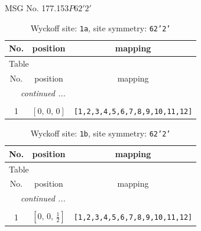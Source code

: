 \documentclass[fleqn,8pt]{jsarticle}
\begin{document}
\setcounter{MaxMatrixCols}{32}

\renewcommand{\tablename}{Table~}
\renewcommand{\figurename}{Figure~}
\begin{center}
\LARGE
MSG No. 177.153\quad$P62'2'$
\end{center}
\renewcommand{\arraystretch}{1.2}
\begin{longtable}{ccc}
\caption{Wyckoff site: {\tt 1a}, site symmetry: {\tt 62'2'}}
 \\
 \hline \hline
No. & position & mapping \\ \hline \endfirsthead

\multicolumn{2}{l}{\tablename\ \thetable{}} \\
 \hline \hline
No. & position & mapping \\ \hline \endhead

 \hline \hline
\multicolumn{2}{r}{\footnotesize\it continued ...} \\ \endfoot

 \hline \hline
\multicolumn{2}{r}{} \\ \endlastfoot

1 & $\left[ 0,\, 0,\, 0 \right]$ & {\tt [1,2,3,4,5,6,7,8,9,10,11,12]} \\
\end{longtable}
\renewcommand{\arraystretch}{1.2}
\begin{longtable}{ccc}
\caption{Wyckoff site: {\tt 1b}, site symmetry: {\tt 62'2'}}
 \\
 \hline \hline
No. & position & mapping \\ \hline \endfirsthead

\multicolumn{2}{l}{\tablename\ \thetable{}} \\
 \hline \hline
No. & position & mapping \\ \hline \endhead

 \hline \hline
\multicolumn{2}{r}{\footnotesize\it continued ...} \\ \endfoot

 \hline \hline
\multicolumn{2}{r}{} \\ \endlastfoot

1 & $\left[ 0,\, 0,\, \frac{1}{2} \right]$ & {\tt [1,2,3,4,5,6,7,8,9,10,11,12]} \\
\end{longtable}
\renewcommand{\arraystretch}{1.2}
\end{document}
